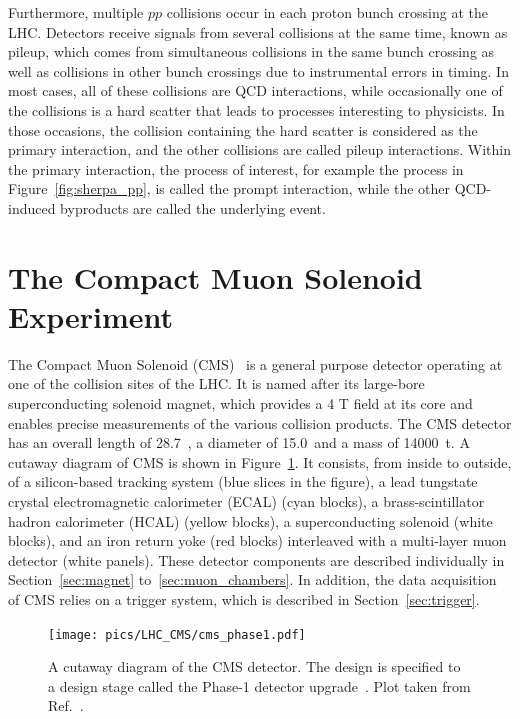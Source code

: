 Furthermore, multiple $pp$ collisions occur in each proton bunch crossing at the LHC.
Detectors receive signals from several collisions at the same time, known as pileup, 
which comes from simultaneous collisions in the same bunch crossing as well as collisions in other bunch crossings due to instrumental errors in timing. 
In most cases, all of these collisions are QCD interactions, 
while occasionally one of the collisions is a hard scatter that leads to processes interesting to physicists.
In those occasions, the collision containing the hard scatter is considered as the primary interaction, 
and the other collisions are called pileup interactions.
Within the primary interaction, the process of interest, for example the \ttH process in Figure~\ref{fig:sherpa_pp},
is called the prompt interaction, while the other QCD-induced byproducts are called the underlying event.



\section{The Compact Muon Solenoid Experiment}\label{sec:cms}


The Compact Muon Solenoid (CMS)~\cite{Collaboration_2008} is a general purpose detector operating at one of the collision sites of the LHC.
It is named after its large-bore superconducting solenoid magnet, 
which provides a 4 T field at its core and enables precise measurements of the various collision products.
The CMS detector has an overall length of 28.7~\meter, a diameter of 15.0~\meter and a mass of 14000~t.
A cutaway diagram of CMS is shown in Figure~\ref{fig:cms_detector}.
It consists, from inside to outside, of a silicon-based tracking system (blue slices in the figure), 
a lead tungstate crystal electromagnetic calorimeter (ECAL) (cyan blocks),
a brass-scintillator hadron calorimeter (HCAL) (yellow blocks),
a superconducting solenoid (white blocks), 
and an iron return yoke (red blocks) interleaved with a multi-layer muon detector (white panels).
These detector components are described individually in Section~\ref{sec:magnet} to~\ref{sec:muon_chambers}.
In addition, the data acquisition of CMS relies on a trigger system, which is described in Section~\ref{sec:trigger}.

\begin{figure}[!htb]
    \centering
    \texttt{[image: pics/LHC\_CMS/cms\_phase1.pdf]}
    \caption{A cutaway diagram of the CMS detector. 
             The design is specified to a design stage called the Phase-1 detector upgrade~\cite{arXiv:2012.14304, Mans:1481837,Tapper:1556311}.
             Plot taken from Ref.~\cite{Sakuma:2665537}.}
    \label{fig:cms_detector}
\end{figure}

